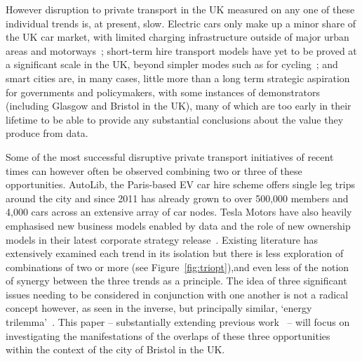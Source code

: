 \documentclass[journal]{IEEEtran}
\begin{document}
However disruption to private transport in the UK measured on any one of these
individual trends is, at present, slow. Electric cars only make up a
minor share of the UK car market, with limited charging infrastructure
outside of major urban areas and motorways~\cite{dft:2008}; short-term hire
transport models have yet to be proved at a significant scale in the
UK, beyond simpler modes such as for
cycling~\cite{kamargianni-et-al:2016}; and smart cities are, in many
cases, little more than a long term strategic aspiration for
governments and policymakers, with some instances of demonstrators
(including Glasgow and Bristol in the UK), many of which are too
early in their lifetime to be able to provide any substantial
conclusions about the value they produce from data.

Some of the most successful disruptive private transport initiatives
of recent times can however often be observed combining two or three
of these opportunities. AutoLib, the Paris-based EV car hire scheme
offers single leg trips around the city and since 2011 has
already grown to over 500,000 members and 4,000 cars across an extensive array of car nodes. Tesla Motors
have also heavily emphasised new business models enabled by data and
the role of new ownership models in their latest corporate strategy
release~\cite{musk:2016}. Existing literature has extensively examined
each trend in its isolation but there is less
exploration of combinations of two or more (see Figure~\ref{fig:triopt}),and even less of
the notion of synergy between the three trends as a principle. The
idea of three significant issues needing to be considered in
conjunction with one another is not a radical concept however, as seen
in the inverse, but principally similar, `energy
trilemma'~\cite{wec:2015}. This paper -- substantially extending
previous work~\cite{cooper-et-al-sose:2015} -- will focus on
investigating the manifestations of the overlaps of these three
opportunities within the context of the city of Bristol in the UK.
\end{document}

